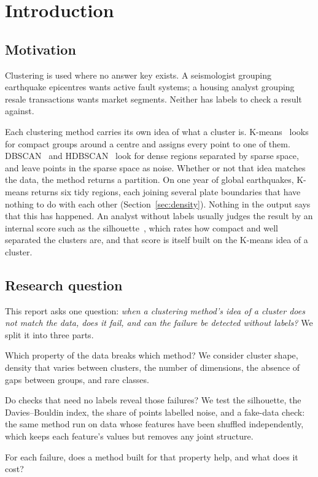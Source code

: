 \section{Introduction}\label{sec:intro}

\subsection{Motivation}
Clustering is used where no answer key exists. A seismologist grouping earthquake epicentres wants
active fault systems; a housing analyst grouping resale transactions wants market segments. Neither
has labels to check a result against.

Each clustering method carries its own idea of what a cluster is. K-means~\cite{lloyd1982} looks for
compact groups around a centre and assigns every point to one of them. DBSCAN~\cite{ester1996} and
HDBSCAN~\cite{campello2013} look for dense regions separated by sparse space, and leave points in the
sparse space as noise. Whether or not that idea matches the data, the method returns a partition. On
one year of global earthquakes, K-means returns six tidy regions, each joining several plate boundaries
that have nothing to do with each other (Section~\ref{sec:density}). Nothing in the output says that
this has happened. An analyst without labels usually judges the result by an internal score such
as the silhouette~\cite{rousseeuw1987}, which rates how compact and well separated the clusters are,
and that score is itself built on the K-means idea of a cluster.

\subsection{Research question}
This report asks one question: \emph{when a clustering method's idea of a cluster does not match the
data, does it fail, and can the failure be detected without labels?} We split it into three parts.
\begin{description}\itemsep1pt
\item[RQ1, cause.] Which property of the data breaks which method? We consider cluster shape, density
that varies between clusters, the number of dimensions, the absence of gaps between groups, and rare
classes.
\item[RQ2, detection.] Do checks that need no labels reveal those failures? We test the silhouette, the
Davies--Bouldin index, the share of points labelled noise, and a fake-data check: the same method run
on data whose features have been shuffled independently, which keeps each feature's values but removes
any joint structure.
\item[RQ3, remedy.] For each failure, does a method built for that property help, and what does it cost?
\end{description}

